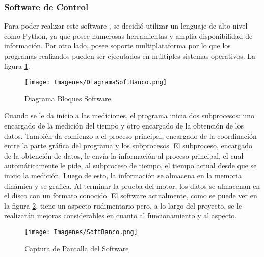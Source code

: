\documentclass[a4paper]{article} %
\begin{document}
\subsubsection{Software de Control}
Para poder realizar este software , se decidió utilizar un lenguaje de alto nivel como Python, ya que posee numerosas herramientas y amplia disponibilidad de información. Por otro lado, posee soporte multiplataforma por lo que los programas realizados pueden ser ejecutados en múltiples sistemas operativos. La figura \ref{fig:BloquesSoftBanco}.
\begin{figure}[!h]
  \centering
    \texttt{[image: Imagenes/DiagramaSoftBanco.png]}
  \caption{Diagrama Bloques Software}
  \label{fig:BloquesSoftBanco}
\end{figure}
Cuando se le da inicio a las mediciones, el programa inicia dos subprocesos: uno encargado de la medición del tiempo y otro encargado de la obtención de los datos. También da comienzo a el proceso principal, encargado de la coordinación entre la parte gráfica del programa y los subprocesos. El subproceso, encargado de la obtención de datos, le envía la información al proceso principal, el cual automáticamente le pide, al subproceso de tiempo, el tiempo actual desde que se inicio la medición. Luego de esto, la información se almacena en la memoria dinámica y se grafica. Al terminar la prueba del motor, los datos se almacenan en el disco con un formato conocido.
El software actualmente, como se puede ver en la figura \ref{fig:SoftBanco}, tiene un aspecto rudimentario pero, a lo largo del proyecto, se le realizarán mejoras considerables en cuanto al funcionamiento y al aspecto.
\begin{figure}[!h]
  \centering
    \texttt{[image: Imagenes/SoftBanco.png]}
  \caption{Captura de Pantalla del Software}
  \label{fig:SoftBanco}
\end{figure}
\end{document}
